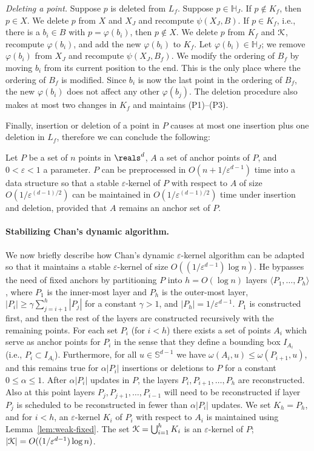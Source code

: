 \documentclass[11pt]{myclass}
\newcommand{\eps}{\varepsilon}
\renewcommand{\b}[1]{\ensuremath{\mathbb{#1}}}
\newcommand{\wid}{\omega}
\def\hcube{\mathbb{H}}
\def\kernel{\EuScript{K}}
\def\nbr{\psi}
\def\inbr{\varphi}
\begin{document}
\textit{Deleting a point.} 
Suppose $p$ is deleted from $L_f$.  Suppose $p \in \hcube_J$. 
If $p \not\in K_f$, then $p \in X$. 
We delete $p$ from $X$ and $X_J$ and recompute $\nbr(X_J,B)$. 
If $p \in K_f$, i.e., there is a $b_i \in B$ with $p=\inbr(b_i)$, then $p \not\in X$.
We delete $p$ from $K_f$ and $\kernel$, recompute $\inbr(b_i)$, and 
add the new $\inbr(b_i)$ to $K_f$.  Let $\inbr(b_i) \in \hcube_J$; we remove $\inbr(b_i)$ from $X_J$ and recompute $\nbr(X_J,B_f)$.
We modify the ordering of $B_f$ by moving $b_i$ from its current position to the end. This is the only place where the ordering of $B_f$ is modified. 
Since $b_i$ is now the last point in the ordering of $B_f$, the new $\inbr(b_i)$ does not affect any other $\inbr(b_j)$. 
The deletion procedure also makes at most two changes in $K_f$ and maintains (P1)--(P3).  

Finally, insertion or deletion of a point in $P$ causes at most one insertion plus one deletion in $L_f$, therefore we can conclude the following:

\begin{lemma}
\label{lem:strong-fixed}
Let $P$ be a set of $n$ points in $\reals^d$, $A$ a set of 
anchor points of $P$, and $0 < \eps < 1$ a parameter. 
$P$ can be preprocessed in $O(n+1/\eps^{d-1})$ time into a 
data structure so that a stable $\eps$-kernel of $P$ with respect to $A$
of size $O(1/\eps^{(d-1)/2})$ can be maintained in 
$O(1/\eps^{(d-1)/2})$ time under insertion and deletion, 
provided that $A$ remains an anchor set of $P$.
\end{lemma}


\paragraph{Stabilizing Chan's dynamic algorithm.}
We now briefly describe how Chan's \cite{Cha08} dynamic $\eps$-kernel algorithm can be adapted so that it maintains a stable $\eps$-kernel of size $O((1/\eps^{d-1}) \log n)$. 
He bypasses the need of fixed anchors by partitioning $P$ into $h=O(\log n)$ layers $\langle P_1, \ldots, P_h\rangle$, where $P_1$ is the inner-most layer and $P_h$ is the outer-most layer,
$|P_i| \geq \gamma \sum_{j=i+1}^h |P_j|$ for a constant $\gamma >1$, and $|P_h| = 1/\eps^{d-1}$. 
$P_1$ is constructed first, and then the rest of the layers are constructed recursively with the remaining points.
For each set $P_i$ (for $i < h$) there exists a set of points $A_i$ which serve as anchor points for $P_i$ in the sense that 
they define a bounding box $I_{A_i}$ (i.e., $P_i \subset I_{A_i}$).  Furthermore, for all $u \in \b{S}^{d-1}$ we have $\wid(A_i,u) \leq \wid(P_{i+1},u)$, and this remains true for $\alpha |P_i|$ insertions or deletions to $P$ for a constant $0 \leq \alpha \leq 1$.
After $\alpha|P_i|$ updates in $P$, the layers $P_i, P_{i+1}, \ldots, P_h$ are reconstructed. Also at this point layers $P_j, P_{j+1}, \ldots, P_{i-1}$ will need to be reconstructed if layer $P_j$ is scheduled to be reconstructed in fewer than $\alpha |P_i|$ updates.  
We set $K_h = P_h$, and for $i < h$, an $\eps$-kernel $K_i$ of $P_i$ with respect to $A_i$ is maintained using Lemma~\ref{lem:weak-fixed}.
The set $\kernel = \bigcup_{i=1}^h K_i$ is an $\eps$-kernel of $P$; 
$|\kernel| = O((1/\eps^{d-1})\log n)$.
\end{document}
